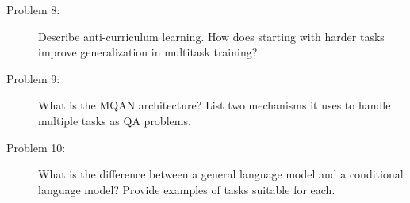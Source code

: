\documentclass[10pt]{article}
\begin{document}
\begin{description}
\item[Problem 8:] Describe anti-curriculum learning. How does starting with harder tasks improve generalization in multitask training?

\pagebreak

\item[Problem 9:] What is the MQAN architecture? List two mechanisms it uses to handle multiple tasks as QA problems.

\pagebreak

\item[Problem 10:] What is the difference between a general language model and a conditional language model? Provide examples of tasks suitable for each.

\end{description}
\end{document}
